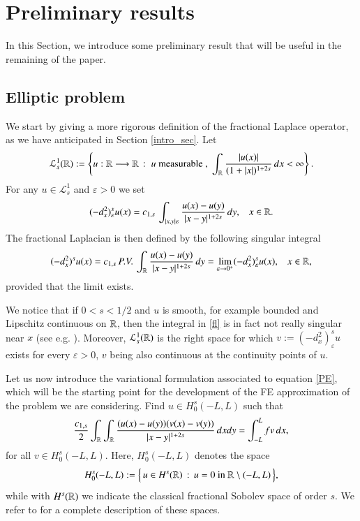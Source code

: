 \section{Preliminary results}\label{theor_sec}

In this Section, we introduce some preliminary result that will be useful in the remaining of the paper.

\subsection{Elliptic problem}

We start by giving a more rigorous definition of the fractional Laplace operator, as we have anticipated in Section \ref{intro_sec}. Let
\begin{align*}
	\mathcal L^1_s(\mathbb{R}) :=\left\{ u:\mathbb{R}\longrightarrow\mathbb{R}\,:\; u\textrm{ measurable },\;\int_{\mathbb{R}}\frac{|u(x)|}{(1+|x|)^{1+2s}}\,dx<\infty\right\}.
\end{align*}
For any $u\in\mathcal L_s^1$ and $\varepsilon>0$ we set 
\begin{align*}
	(-d_x^2)^s_{\varepsilon} u(x) = c_{1,s}\,\int_{|x,y|\varepsilon}\frac{u(x)-u(y)}{|x-y|^{1+2s}}\,dy,\;\;\; x\in\mathbb{R}.
\end{align*}
The fractional Laplacian is then defined by the following singular integral
\begin{align}\label{fl}
	(-d_x^2)^{s}u(x) = c_{1,s}\,P.V.\,\int_{\mathbb{R}}\frac{u(x)-u(y)}{|x-y|^{1+2s}}\,dy = \lim_{\varepsilon\to 0^+} (-d_x^2)^s_{\varepsilon} u(x), \;\;\; x\in\mathbb{R},
\end{align}
provided that the limit exists. 

We notice that if $0<s<1/2$ and $u$ is smooth, for example bounded and Lipschitz continuous on $\mathbb{R}$, then the integral in \eqref{fl} is in fact not really singular near $x$ (see e.g. \cite[Remark 3.1]{dihitchhiker}). Moreover, $\mathcal L_s^1(\mathbb{R})$ is the right space for which $v:= (-d_x^2)^s_{\varepsilon} u$ exists for every $\varepsilon > 0$, $v$ being also continuous at the continuity points of $u$.

Let us now introduce the variational formulation associated to equation \eqref{PE}, which will be the starting point for the development of the FE approximation of the problem we are considering. Find $u\in H^s_0(-L,L)$ such that
\begin{align}\label{WF}
	\frac{c_{1,s}}{2} \int_{\mathbb{R}}\int_{\mathbb{R}}\frac{(u(x)-u(y))(v(x)-v(y))}{|x-y|^{1+2s}}\,dxdy = \int_{-L}^L fv\,dx,	
\end{align}
for all $v\in H_0^s(-L,L)$. Here, $H^s_0(-L,L)$ denotes the space 
\begin{align*}
	H^s_0(-L,L) :=\Big\{\, u\in H^s(\mathbb{R})\,:\,u=0 \textrm{ in } \mathbb{R}\setminus(-L,L)\,\Big\}, 
\end{align*}
while with $H^s(\mathbb{R})$ we indicate the classical fractional Sobolev space of order $s$. We refer to \cite{dihitchhiker} for a complete description of these spaces.  


